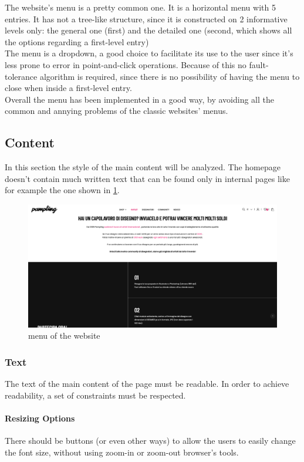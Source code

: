 The website's menu is a pretty common one. It is a horizontal menu with 5 entries. 
It has not a tree-like structure, since it is constructed on 2 informative levels only: the general one (first) and the detailed one (second, which shows all the options regarding a first-level entry)\\
The menu is a dropdown, a good choice to facilitate its use to the user since it's less prone to error in point-and-click operations. 
Because of this no fault-tolerance algorithm is required, since there is no possibility of having the menu to close when inside a first-level entry.\\
Overall the menu has been implemented in a good way, by avoiding all the common and annying problems of the classic websites' menus.

\subsection{Content}
In this section the style of the main content will be analyzed. 
The homepage doesn't contain much written text that can be found only in internal pages like for example 
the one shown in \cref{fig:content}.

\begin{figure}[h!]
	\centering
	\includegraphics[scale=0.225]{images/content.png}
	\caption{menu of the website}
	\label{fig:content}
\end{figure}

\subsubsection{Text}
The text of the main content of the page must be readable. 
In order to achieve readability, a set of constraints must be respected.

\paragraph{Resizing Options}
There should be buttons (or even other ways) to allow the users to easily change the font size, without using zoom-in or zoom-out browser's tools.\\

